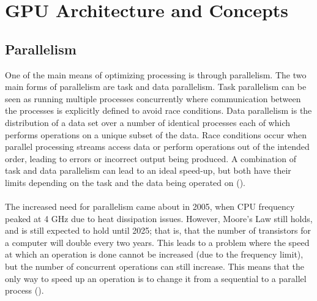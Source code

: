 \section{GPU Architecture and Concepts}\label{gpu}
\subsection{Parallelism}\label{gpu:sec:par}
One of the main means of optimizing processing is through parallelism. The two main forms of parallelism are task and data parallelism. Task parallelism can be seen as running multiple processes concurrently where communication between the processes is explicitly defined to avoid race conditions. Data parallelism is the distribution of a data set over a number of identical processes each of which performs operations on a unique subset of the data. Race conditions occur when parallel processing streams access data or perform operations out of the intended order, leading to errors or incorrect output being produced. A combination of task and data parallelism can lead to an ideal speed-up, but both have their limits depending on the task and the data being operated on (\cite{subhlok1993exploiting}).
\\
\\
The increased need for parallelism came about in 2005, when CPU frequency peaked at 4 GHz due to heat dissipation issues. However, Moore's Law still holds, and is still expected to hold until 2025; that is, that the number of transistors for a computer will double every two years. This leads to a problem where the speed at which an operation is done cannot be increased (due to the frequency limit), but the number of concurrent operations can still increase. This means that the only way to speed up an operation is to change it from a sequential to a parallel process (\cite{rajan2013informatics}).
